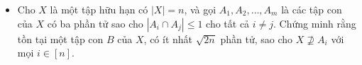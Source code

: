 \documentclass[11pt]{scrartcl}
\begin{document}
\begin{itemize}[label=, leftmargin=0em, itemsep=-0em]
\begin{btvn}
\begin{enumerate}[label=(\alph*)]
        \end{enumerate}
    \end{btvn}
    \item \begin{btvn}
        Cho $X$ là một tập hữu hạn có $|X| = n$, và gọi $A_1, A_2, \dots, A_m$ là các tập con của $X$ có ba phần tử sao cho $|A_i \cap A_j| \le 1$ cho tất cả $i \neq j$. Chứng minh rằng tồn tại một tập con $B$ của $X$, có ít nhất $\sqrt{2n}$ phần tử, sao cho $X \nsupseteq  A_i$ với mọi $i \in [n]$.
    \end{btvn}

\end{itemize}
\end{document}
